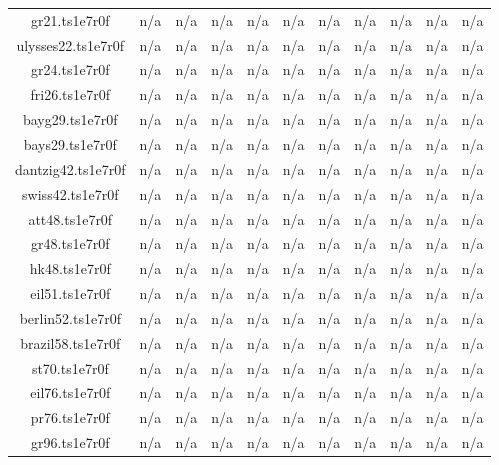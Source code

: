 \begin{table}[htbp]
\begin{tabular}{|ccccccccccc|}
gr21.ts1e7r0f & n/a & n/a & n/a & n/a & n/a & n/a & n/a & n/a & n/a & n/a \\
ulysses22.ts1e7r0f & n/a & n/a & n/a & n/a & n/a & n/a & n/a & n/a & n/a & n/a \\
gr24.ts1e7r0f & n/a & n/a & n/a & n/a & n/a & n/a & n/a & n/a & n/a & n/a \\
fri26.ts1e7r0f & n/a & n/a & n/a & n/a & n/a & n/a & n/a & n/a & n/a & n/a \\
bayg29.ts1e7r0f & n/a & n/a & n/a & n/a & n/a & n/a & n/a & n/a & n/a & n/a \\
bays29.ts1e7r0f & n/a & n/a & n/a & n/a & n/a & n/a & n/a & n/a & n/a & n/a \\
dantzig42.ts1e7r0f & n/a & n/a & n/a & n/a & n/a & n/a & n/a & n/a & n/a & n/a \\
swiss42.ts1e7r0f & n/a & n/a & n/a & n/a & n/a & n/a & n/a & n/a & n/a & n/a \\
att48.ts1e7r0f & n/a & n/a & n/a & n/a & n/a & n/a & n/a & n/a & n/a & n/a \\
gr48.ts1e7r0f & n/a & n/a & n/a & n/a & n/a & n/a & n/a & n/a & n/a & n/a \\
hk48.ts1e7r0f & n/a & n/a & n/a & n/a & n/a & n/a & n/a & n/a & n/a & n/a \\
eil51.ts1e7r0f & n/a & n/a & n/a & n/a & n/a & n/a & n/a & n/a & n/a & n/a \\
berlin52.ts1e7r0f & n/a & n/a & n/a & n/a & n/a & n/a & n/a & n/a & n/a & n/a \\
brazil58.ts1e7r0f & n/a & n/a & n/a & n/a & n/a & n/a & n/a & n/a & n/a & n/a \\
st70.ts1e7r0f & n/a & n/a & n/a & n/a & n/a & n/a & n/a & n/a & n/a & n/a \\
eil76.ts1e7r0f & n/a & n/a & n/a & n/a & n/a & n/a & n/a & n/a & n/a & n/a \\
pr76.ts1e7r0f & n/a & n/a & n/a & n/a & n/a & n/a & n/a & n/a & n/a & n/a \\
gr96.ts1e7r0f & n/a & n/a & n/a & n/a & n/a & n/a & n/a & n/a & n/a & n/a \\
\hline
\end{tabular}
\end{table}
